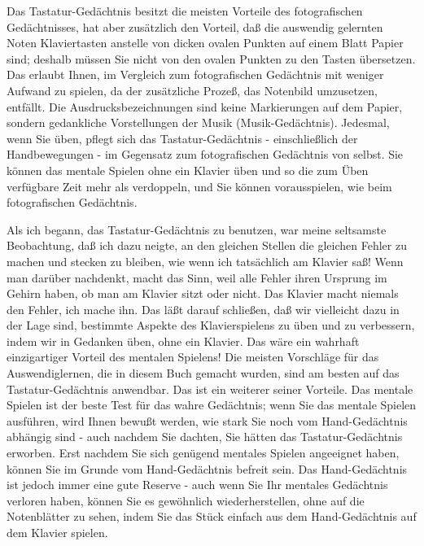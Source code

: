 Das Tastatur-Gedächtnis besitzt die meisten Vorteile des fotografischen Gedächtnisses, hat aber zusätzlich den Vorteil, daß die auswendig gelernten Noten Klaviertasten anstelle von dicken ovalen Punkten auf einem Blatt Papier sind; deshalb müssen Sie nicht von den ovalen Punkten zu den Tasten übersetzen.
Das erlaubt Ihnen, im Vergleich zum fotografischen Gedächtnis mit weniger Aufwand zu spielen, da der zusätzliche Prozeß, das Notenbild umzusetzen, entfällt.
Die Ausdrucksbezeichnungen sind keine Markierungen auf dem Papier, sondern gedankliche Vorstellungen der Musik (Musik-Gedächtnis).
Jedesmal, wenn Sie üben, pflegt sich das Tastatur-Gedächtnis - einschließlich der Handbewegungen - im Gegensatz zum fotografischen Gedächtnis von selbst.
Sie können das mentale Spielen ohne ein Klavier üben und so die zum Üben verfügbare Zeit mehr als verdoppeln, und Sie können vorausspielen, wie beim fotografischen Gedächtnis.

Als ich begann, das Tastatur-Gedächtnis zu benutzen, war meine seltsamste Beobachtung, daß ich dazu neigte, an den gleichen Stellen die gleichen Fehler zu machen und stecken zu bleiben, wie wenn ich tatsächlich am Klavier saß!
Wenn man darüber nachdenkt, macht das Sinn, weil alle Fehler ihren Ursprung im Gehirn haben, ob man am Klavier sitzt oder nicht.
Das Klavier macht niemals den Fehler, ich mache ihn.
Das läßt darauf schließen, daß wir vielleicht dazu in der Lage sind, bestimmte Aspekte des Klavierspielens zu üben und zu verbessern, indem wir in Gedanken üben, ohne ein Klavier.
Das wäre ein wahrhaft einzigartiger Vorteil des mentalen Spielens!
Die meisten Vorschläge für das Auswendiglernen, die in diesem Buch gemacht wurden, sind am besten auf das Tastatur-Gedächtnis anwendbar.
Das ist ein weiterer seiner Vorteile.
Das mentale Spielen ist der beste Test für das wahre Gedächtnis; wenn Sie das mentale Spielen ausführen, wird Ihnen bewußt werden, wie stark Sie noch vom Hand-Gedächtnis abhängig sind - auch nachdem Sie dachten, Sie hätten das Tastatur-Gedächtnis erworben.
Erst nachdem Sie sich genügend mentales Spielen angeeignet haben, können Sie im Grunde vom Hand-Gedächtnis befreit sein.
Das Hand-Gedächtnis ist jedoch immer eine gute Reserve - auch wenn Sie Ihr mentales Gedächtnis verloren haben, können Sie es gewöhnlich wiederherstellen, ohne auf die Notenblätter zu sehen, indem Sie das Stück einfach aus dem Hand-Gedächtnis auf dem Klavier spielen.

